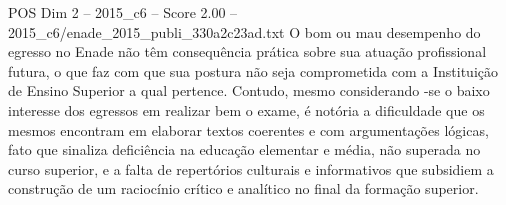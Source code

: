 \begin{textsample}{POS Dim 2 – 2015\_c6 – Score 2.00 – 2015\_c6/enade\_2015\_publi\_330a2c23ad.txt}
O bom ou mau desempenho do egresso no Enade não têm consequência prática sobre sua atuação profissional futura, o que faz com que sua postura não seja comprometida com a Instituição de Ensino Superior a qual pertence.
Contudo, mesmo considerando -se o baixo interesse dos egressos em realizar bem o exame, é notória a dificuldade que os mesmos encontram em elaborar textos coerentes e com argumentações lógicas, fato que sinaliza deficiência na educação elementar e média, não superada no curso superior, e a falta de repertórios culturais e informativos que subsidiem a construção de um raciocínio crítico e analítico no final da formação superior.

\end{textsample}
